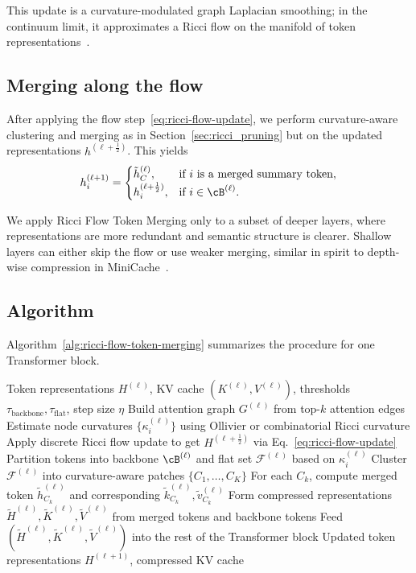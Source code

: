 \documentclass{article}
\theoremstyle{plain}
\theoremstyle{definition}
\theoremstyle{remark}
\newcommand{\cF}{\mathcal{F}}
\begin{document}
This update is a curvature-modulated graph Laplacian smoothing; in the continuum limit, it approximates a Ricci flow on the manifold of token representations~\citep{baptista2024deep,yadav2025roadmap}.

\subsection{Merging along the flow}

After applying the flow step~\eqref{eq:ricci-flow-update}, we perform curvature-aware clustering and merging as in Section~\ref{sec:ricci_pruning} but on the updated representations $h^{(\ell+\frac{1}{2})}$. This yields
\begin{equation}
  h^{(\ell+1)}_i =
  \begin{cases}
    \tilde{h}^{(\ell)}_C, & \text{if $i$ is a merged summary token}, \\
    h^{(\ell+\frac{1}{2})}_i, & \text{if $i\in \cB^{(\ell)}$}.
  \end{cases}
\end{equation}

We apply Ricci Flow Token Merging only to a subset of deeper layers, where representations are more redundant and semantic structure is clearer. Shallow layers can either skip the flow or use weaker merging, similar in spirit to depth-wise compression in MiniCache~\citep{liu2024minicache}.

\subsection{Algorithm}

Algorithm~\ref{alg:ricci-flow-token-merging} summarizes the procedure for one Transformer block.

\begin{algorithm}[t]
\caption{Ricci Flow Token Merging (single block)}
\label{alg:ricci-flow-token-merging}
\begin{algorithmic}[1]
\REQUIRE Token representations $H^{(\ell)}$, KV cache $(K^{(\ell)}, V^{(\ell)})$, thresholds $\tau_\mathrm{backbone}, \tau_\mathrm{flat}$, step size $\eta$
\STATE Build attention graph $G^{(\ell)}$ from top-$k$ attention edges
\STATE Estimate node curvatures $\{\kappa^{(\ell)}_i\}$ using Ollivier or combinatorial Ricci curvature
\STATE Apply discrete Ricci flow update to get $H^{(\ell+\frac{1}{2})}$ via Eq.~\eqref{eq:ricci-flow-update}
\STATE Partition tokens into backbone $\cB^{(\ell)}$ and flat set $\cF^{(\ell)}$ based on $\kappa^{(\ell)}_i$
\STATE Cluster $\cF^{(\ell)}$ into curvature-aware patches $\{C_1,\dots,C_K\}$
\STATE For each $C_k$, compute merged token $\tilde{h}^{(\ell)}_{C_k}$ and corresponding $\tilde{k}^{(\ell)}_{C_k}, \tilde{v}^{(\ell)}_{C_k}$
\STATE Form compressed representations $\tilde{H}^{(\ell)}, \tilde{K}^{(\ell)}, \tilde{V}^{(\ell)}$ from merged tokens and backbone tokens
\STATE Feed $(\tilde{H}^{(\ell)}, \tilde{K}^{(\ell)}, \tilde{V}^{(\ell)})$ into the rest of the Transformer block
\RETURN Updated token representations $H^{(\ell+1)}$, compressed KV cache
\end{algorithmic}
\end{algorithm}
\end{document}
